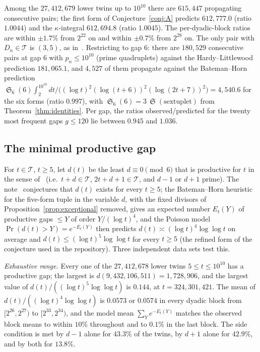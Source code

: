 \documentclass[11pt,a4paper]{article}
\theoremstyle{plain}
\theoremstyle{definition}
\theoremstyle{remark}
\newcommand{\Tset}{\mathcal{T}}
\DeclareMathOperator{\Sing}{\mathfrak S}
\begin{document}
Among the $27{,}412{,}679$ lower twins up to $10^{10}$ there are
$615{,}447$ propagating consecutive pairs; the first form of
Conjecture~\ref{conj:A} predicts $612{,}777.0$ (ratio $1.0044$) and the
$\kappa$-integral $612{,}694.8$ (ratio $1.0045$).  The per-dyadic-block
ratios are within $\pm1.7\%$ from $2^{22}$ on and within $\pm0.7\%$ from
$2^{28}$ on.  The only pair with $D_n\in\Tset$ is $(3,5)$, as
in~\cite{BiertonThm}.  Restricting to gap $6$: there
are $180{,}529$ consecutive pairs at gap $6$ with $p_n\le10^{10}$ (prime
quadruplets) against the Hardy--Littlewood prediction $181{,}065.1$, and
$4{,}527$ of them propagate against the Bateman--Horn prediction
$\Sing_6(6)\int_2^{10^{10}}dt/\bigl((\log t)^2(\log(t+6))^2(\log(2t+7))^2\bigr)=4{,}540.6$
for the six forms (ratio $0.997$), with $\Sing_6(6)=3\,\Sing(\text{sextuplet})$
from Theorem~\ref{thm:identities}.  Per gap, the ratios observed/predicted
for the twenty most frequent gaps $g\le120$ lie between $0.945$ and $1.036$.

\subsection*{The minimal productive gap}

For $t\in\Tset$, $t\ge5$, let $d(t)$ be the least $d\equiv0\pmod6$ that is
productive for $t$ in the sense of~\cite{BiertonGap} (i.e.\ $t+d\in\Tset$,
$2t+d+1\in\Tset$, and $d-1$ or $d+1$ prime).  The note~\cite{BiertonGap}
conjectures that $d(t)$ exists for every $t\ge5$; the Bateman--Horn
heuristic for the five-form tuple in the variable $d$, with the fixed
divisors of Proposition~\ref{prop:exceptional} removed, gives an expected
number $E_t(Y)$ of productive gaps $\le Y$ of order $Y/(\log t)^4$, and the
Poisson model $\Pr(d(t)>Y)=e^{-E_t(Y)}$ then predicts
$d(t)\asymp(\log t)^4\log\log t$ on average and
$d(t)\le(\log t)^5\log\log t$ for every $t\ge5$ (the refined form of the
conjecture used in the repository).  Three independent data sets test this.

\emph{Exhaustive range.}  Every one of the $27{,}412{,}678$ lower twins
$5\le t\le10^{10}$ has a productive gap; the largest is
$d(9{,}432{,}106{,}511)=1{,}728{,}906$, and the largest value of
$d(t)/((\log t)^5\log\log t)$ is $0.144$, at $t=324{,}301{,}421$.  The mean
of $d(t)/((\log t)^4\log\log t)$ is $0.0573$ or $0.0574$ in every dyadic
block from $[2^{26},2^{27})$ to $[2^{33},2^{34})$, and the model mean
$\sum_Y e^{-E_t(Y)}$ matches the observed block means to within $10\%$
throughout and to $0.1\%$ in the last block.  The side condition is met by
$d-1$ alone for $43.3\%$ of the twins, by $d+1$ alone for $42.9\%$, and by
both for $13.8\%$.
\end{document}
